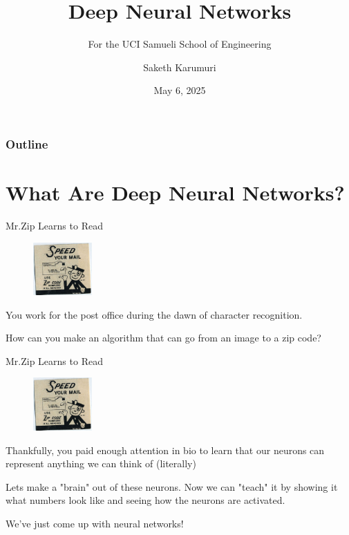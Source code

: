 \documentclass[aspectratio=169, 10pt]{beamer} %
\title[Beamer template]{Deep Neural Networks}
\subtitle{For the UCI Samueli School of Engineering}
\author{Saketh Karumuri}
\institute{UCI Samueli School of Engineering}
\date{May 6, 2025}
\begin{document}
\begin{frame}
    \titlepage
\end{frame}

    \begin{frame}
        \frametitle{Outline}
        \tableofcontents
    \end{frame}
\section{What Are Deep Neural Networks?}

\begin{frame}{ Mr.Zip Learns to Read}
    \begin{figure}
            \centering
    \includegraphics[width=0.2\textwidth]{mrzip.jpg}
    \end{figure}
  You work for the post office during the dawn of character recognition. \par How can you make an algorithm that can go from an image to a zip code?\par 
\end{frame}\begin{frame}{ Mr.Zip Learns to Read}
    \begin{figure}
            \centering
    \includegraphics[width=0.2\textwidth]{mrzip.jpg}
    \end{figure}
  Thankfully, you paid enough attention in bio to learn that our neurons can represent anything we can think of (literally) \par
  Lets make a "brain" out of these neurons. Now we can "teach" it by showing it what numbers look like and seeing how the neurons are activated. \par
  We've just come up with neural networks!
\end{frame}
\end{document}
